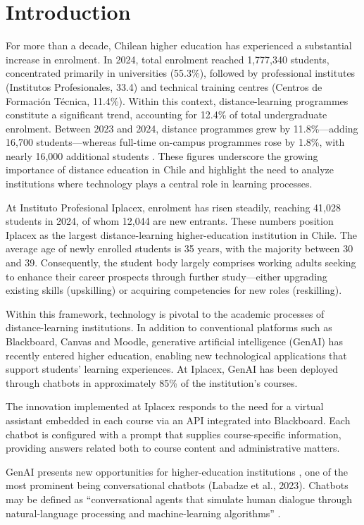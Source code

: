 \documentclass[sn-apa]{sn-jnl} %
\begin{document}
\section{Introduction}\label{sec1}


For more than a decade, Chilean higher education has experienced a substantial
increase in enrolment. In 2024, total enrolment reached 1,777,340 students,
concentrated primarily in universities (55.3\%), followed by professional
institutes (Institutos Profesionales, 33.4) and technical training centres
(Centros de Formación Técnica, 11.4\%). Within this context, distance-learning
programmes constitute a significant trend, accounting for 12.4\% of total
undergraduate enrolment. Between 2023 and 2024, distance programmes grew by
11.8\%—adding 16,700 students—whereas full-time on-campus programmes rose by
1.8\%, with nearly 16,000 additional students \citep{SIES2024Matriculas}.
These figures underscore the growing importance of distance education in Chile
and highlight the need to analyze institutions where technology plays a central
role in learning processes.

At Instituto Profesional Iplacex, enrolment has risen steadily, reaching 41,028
students in 2024, of whom 12,044 are new entrants. These numbers position
Iplacex as the largest distance-learning higher-education institution in Chile.
The average age of newly enrolled students is 35 years, with the majority
between 30 and 39. Consequently, the student body largely comprises working
adults seeking to enhance their career prospects through further study—either
upgrading existing skills (upskilling) or acquiring competencies for new roles
(reskilling).

Within this framework, technology is pivotal to the academic processes of
distance-learning institutions. In addition to conventional platforms such as
Blackboard, Canvas and Moodle, generative artificial intelligence (GenAI) has
recently entered higher education, enabling new technological applications that
support students’ learning experiences. At Iplacex, GenAI has been deployed
through chatbots in approximately 85\% of the institution’s courses.

The innovation implemented at Iplacex responds to the need for a virtual
assistant embedded in each course via an API integrated into Blackboard. Each
chatbot is configured with a prompt that supplies course-specific information,
providing answers related both to course content and administrative matters.

GenAI presents new opportunities for higher-education institutions
\citep{Puryear22}, one of the most prominent being conversational chatbots
(Labadze et al., 2023). Chatbots may be defined as “conversational agents that
simulate human dialogue through natural-language processing and machine-learning
algorithms” \citep[p.~1]{Stoehr24A}.
\end{document}
